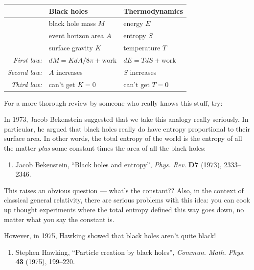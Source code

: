 \documentclass{article}
\def\tightlist{}
\renewcommand{\texttt}[1]{%
  \begingroup
  \ttfamily
  \begingroup\lccode`~=`/\lowercase{\endgroup\def~}{/\discretionary{}{}{}}%
  \begingroup\lccode`~=`[\lowercase{\endgroup\def~}{[\discretionary{}{}{}}%
  \begingroup\lccode`~=`.\lowercase{\endgroup\def~}{.\discretionary{}{}{}}%
  \catcode`/=\active\catcode`[=\active\catcode`.=\active
  \scantokens{#1\noexpand}%
  \endgroup
}
\begin{document}
\begin{longtable}[]{@{}rll@{}}
\toprule
& Black holes & Thermodynamics\tabularnewline
\midrule
\endhead
& black hole mass \(M\) & energy \(E\)\tabularnewline
& event horizon area \(A\) & entropy \(S\)\tabularnewline
& surface gravity \(K\) & temperature \(T\)\tabularnewline
\emph{First law:} & \(dM=KdA/8\pi+\mathrm{work}\) &
\(dE=TdS+\mathrm{work}\)\tabularnewline
\emph{Second law:} & \(A\) increases & \(S\) increases\tabularnewline
\emph{Third law:} & can't get \(K=0\) & can't get \(T=0\)\tabularnewline
\bottomrule
\end{longtable}

For a more thorough review by someone who really knows this stuff, try:


In 1973, Jacob Bekenstein suggested that we take this analogy really
seriously. In particular, he argued that black holes really do have
entropy proportional to their surface area. In other words, the total
entropy of the world is the entropy of all the matter \emph{plus} some
constant times the area of all the black holes:

\begin{enumerate}
\def\labelenumi{\arabic{enumi})}
\setcounter{enumi}{3}
\tightlist
\item
  Jacob Bekenstein, ``Black holes and entropy'', \emph{Phys. Rev.}
  \textbf{D7} (1973), 2333--2346.
\end{enumerate}

This raises an obvious question --- what's the constant?? Also, in the
context of classical general relativity, there are serious problems with
this idea: you can cook up thought experiments where the total entropy
defined this way goes down, no matter what you say the constant is.

However, in 1975, Hawking showed that black holes aren't quite black!

\begin{enumerate}
\def\labelenumi{\arabic{enumi})}
\setcounter{enumi}{4}
\tightlist
\item
  Stephen Hawking, ``Particle creation by black holes'', \emph{Commun.
  Math. Phys.} \textbf{43} (1975), 199--220.
\end{enumerate}
\end{document}
